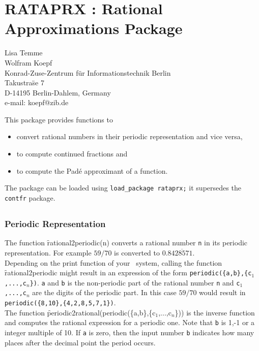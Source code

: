 \chapter[RATAPRX: Rational Approximations]%
{RATAPRX : Rational Approximations Package}
\label{RATAPRX}

{\footnotesize
\begin{center}
Lisa Temme\\
Wolfram Koepf\\
Konrad-Zuse-Zentrum f\"ur Informationstechnik Berlin\\
Takustra\"se 7 \\
D-14195 Berlin-Dahlem, Germany \\
e-mail: koepf@zib.de 
\end{center}
}


This package provides functions to 
\begin{itemize}
\item convert rational numbers in their periodic representation and vice versa, 
\item to compute continued fractions and 
\item to compute the Pad\'{e} approximant of a function. 
\end{itemize}
The package can be loaded using {\tt load\_package rataprx;} it supersedes 
the {\tt contfr} package. 


\section{}
\subsection{Periodic Representation}

The function \f{rational2periodic(n)}
converts a rational number {\tt n} in its periodic representation. 
For example $59/70$ is converted to $0.8\overline{428571}$. \\
Depending on the print function of your \REDUCE\ system, calling the
function \f{rational2periodic} might result in an expression of 
the form {\tt periodic(\{a,b\},\{c$_1$,...,c$_n$\})}. 
{\tt a} and {\tt b} is the non-periodic part of the rational number 
{\tt n} and {\tt c$_1$,...,c$_n$} are the digits of the periodic part. 
In this case $59/70$ would result in {\tt periodic(\{8,10\},\{4,2,8,5,7,1\})}. \\
The function \f{periodic2rational(periodic(\{a,b\},\{c$_1$,...,c$_n$\}))
} is the
inverse function and computes the rational expression for a periodic one.
Note that {\tt b} is 1,-1 or a integer multiple of 10. If {\tt a} is zero,
then the input number {\tt b} indicates how many places after the decimal 
point the period occurs. 

